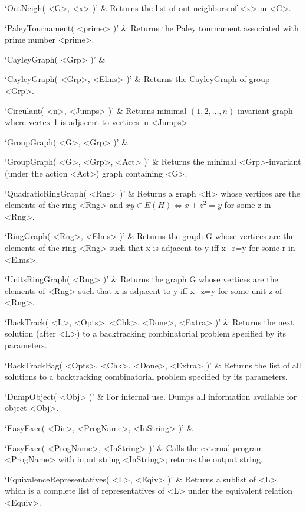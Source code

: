 `OutNeigh( <G>, <x> )' & 
Returns the list of out-neighbors of <x> in <G>.

`PaleyTournament( <prime> )' &
Returns the Paley tournament associated with prime number <prime>.
\enditems


\beginitems
`CayleyGraph( <Grp> )' & 

`CayleyGraph( <Grp>, <Elms> )' & 
Returns the CayleyGraph of group <Grp>.

`Circulant( <n>, <Jumps> )' & 
Returns minimal $(1, 2, ..., n)$-invariant graph where vertex 1 is adjacent to vertices in <Jumps>.

`GroupGraph( <G>, <Grp> )' & 

`GroupGraph( <G>, <Grp>, <Act> )' & 
Returns the minimal <Grp>-invariant (under the action <Act>) graph containing <G>.

`QuadraticRingGraph( <Rng> )' & 
Returns a graph <H> whose vertices are the elements of the ring <Rng> and $xy\in E(H) \iff x+z^2=y$ for some z in <Rng>.

`RingGraph( <Rng>, <Elms> )' & 
Returns  the  graph  G  whose  vertices are the elements of the ring <Rng>
such that x is adjacent to y iff x+r=y for some r in <Elms>.

`UnitsRingGraph( <Rng> )' & 
Returns  the graph G whose vertices are the elements of <Rng>  such that x
is adjacent to y iff x+z=y for some unit z of <Rng>.
\enditems


\beginitems
`BackTrack( <L>, <Opts>, <Chk>, <Done>, <Extra> )' & 
Returns the next solution (after <L>) to a backtracking combinatorial problem specified by its parameters.

`BackTrackBag( <Opts>, <Chk>, <Done>, <Extra> )' & 
Returns the list of all solutions to a backtracking combinatorial problem specified by its parameters.
\enditems


\beginitems
`DumpObject( <Obj> )' & 
For internal use. Dumps  all information available for object <Obj>.

`EasyExec( <Dir>, <ProgName>, <InString> )' & 

`EasyExec( <ProgName>, <InString> )' & 
Calls the external program <ProgName> with input string <InString>; returns the output string.

`EquivalenceRepresentatives( <L>, <Eqiv> )' &
Returns a sublist of <L>, which is a complete list of representatives of 
<L> under the equivalent relation <Equiv>.

